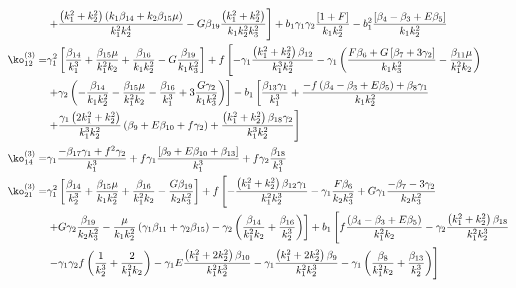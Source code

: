 {\begin{align*}
&\left. + \frac{\left( k_1^2 + k_2^2 \right) \left( k_1 \beta_{14} + k_2 \beta_{15} \mu \right) }{k_1^2 k_2^4}  - G \beta_{19} \frac{\left( k_1^2 + k_2^2 \right)}{k_1 k_2^2 k_3^2}  \right] + b_1 \gamma_1 \gamma_2 \frac{\left[ 1 + F\right]}{k_1 k_2^2} - b_1^2 \frac{\left[ {\beta_{4}-\beta_{3}} + E \beta_{5}\right]}{k_1 k_2^2} \\
\ko_{12}^{(3)}=& \gamma_1^2 \left[ \frac{\beta_{14}}{k_1^3} + \frac{\beta_{15} \mu}{k_1^2 k_2} + \frac{\beta_{16}}{k_1 k_2^2} - G \frac{\beta_{19}}{k_1 k_3^2} \right] + f \left[ - \gamma_1 \frac{\left( k_1^2 + k_2^2 \right) \beta_{12}}{k_1^3 k_2^2} - \gamma_1 \left( \frac{F \beta_{6} + G \left[ \beta_{7} + 3 \gamma_2 \right]}{k_1 k_3^2} - \frac{\beta_{11} \mu }{k_1^2 k_2 }  \right) \right. \\
&\left. + \gamma_2 \left( - \frac{\beta_{14}}{k_1 k_2^2} - \frac{\beta_{15} \mu }{k_1^2 k_2} - \frac{\beta_{16}}{k_1^3} + 3 \frac{G \gamma_2}{k_1 k_3^2} \right) \right] - b_1 \left[ \frac{\beta_{13} \gamma_1}{k_1^3} + \frac{-f \left({\beta_{4}-\beta_{3}} + E \beta_{5} \right) + \beta_{8} \gamma_1}{k_1 k_2^2 } \right. \\
&\left. + \frac{\gamma_1 \left(2 k_1^2 + k_2^2\right)}{k_1^3 k_2^2} \left( \beta_{9} + E \beta_{10} + f \gamma_2 \right) + \frac{\left(k_1^2 + k_2^2\right) \beta_{18} \gamma_2}{k_1^3 k_2^2}  \right]\\
\ko_{14}^{(3)}=& \gamma_1 \frac{- \beta_{17} \gamma_1 + f^2 \gamma_2}{k_1^3} + f \gamma_1 \frac{\left[ \beta_{9} + E \beta_{10} + \beta_{13} \right]}{k_1^3} + f \gamma_2\frac{\beta_{18}}{k_1^3}\\
\ko_{21}^{(3)}=& \gamma_1^2 \left[  \frac{\beta_{14}}{k_2^3} + \frac{\beta_{15} \mu }{k_1 k_2^2} + \frac{\beta_{16}}{k_1^2 k_2} - \frac{G \beta_{19}}{k_2 k_3^2} \right] + f \left[  -\frac{\left( k_1^2 + k_2^2 \right)\beta_{12} \gamma_1 }{k_1^2 k_2^3}  - \gamma_1 \frac{F \beta_{6}}{k_2 k_3^2} +  G \gamma_1 \frac{-\beta_{7} - 3 \gamma_2}{k_2 k_3^2} \right. \\
&\left.+ G \gamma_2 \frac{\beta_{19}}{k_2 k_3^2} - \frac{\mu}{k_1 k_2^2} \left( \gamma_1 \beta_{11} + \gamma_2 \beta_{15} \right) - \gamma_2 \left( \frac{\beta_{14}}{k_1^2 k_2} + \frac{\beta_{16}}{k_2^3} \right) \right] + b_1 \left[ f \frac{\left( {\beta_{4}-\beta_{3}} + E \beta_{5} \right)}{k_1^2 k_2} - \gamma_2 \frac{\left( k_1^2 + k_2^2\right) \beta_{18}}{k_1^2 k_2^3} \right. \\
&\left. - \gamma_1 \gamma_2 f \left( \frac{1}{k_2^3} + \frac{2}{k_1^2 k_2}\right) - \gamma_1 E \frac{\left( k_1^2 + 2 k_2^2\right) \beta_{10} }{k_1^2 k_2^3} - \gamma_1 \frac{\left(k_1^2 + 2 k_2^2 \right) \beta_{9}}{k_1^2 k_2^3} - \gamma_1 \left( \frac{\beta_{8}}{k_1^2 k_2} + \frac{\beta_{13}}{k_2^3} \right) \right]\\

\end{align*}}
